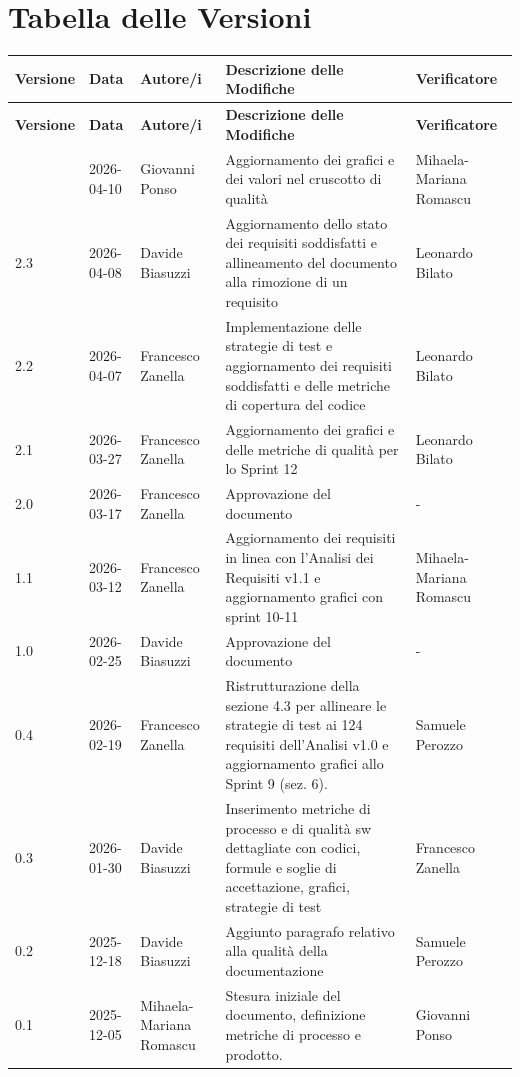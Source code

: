 \documentclass[a4paper,11pt,oneside]{scrartcl}
\begin{document}
\section*{Tabella delle Versioni}
\vspace{0.2cm}
{%
\renewcommand{\arraystretch}{1.2}
\setlength{\LTleft}{-0.4cm}
\setlength{\LTright}{0pt}
\begin{longtable}{@{}llp{}p{}p{}@{}}
    \toprule
    \textbf{Versione} & \textbf{Data} & \textbf{Autore/i} & \textbf{Descrizione delle Modifiche} & \textbf{Verificatore} \\
    \midrule
    \endfirsthead
    \toprule
    \textbf{Versione} & \textbf{Data} & \textbf{Autore/i} & \textbf{Descrizione delle Modifiche} & \textbf{Verificatore} \\
    \midrule
    \endhead
    \bottomrule
    \endfoot
    \bottomrule
    \endlastfoot
2.4 & 2026-04-10 & Giovanni Ponso & Aggiornamento dei grafici e dei valori nel cruscotto di qualità & Mihaela-Mariana Romascu\\
2.3 & 2026-04-08 & Davide Biasuzzi & Aggiornamento dello stato dei requisiti soddisfatti e allineamento del documento alla rimozione di un requisito & Leonardo Bilato\\
2.2 & 2026-04-07 & Francesco Zanella & Implementazione delle strategie di test e aggiornamento dei requisiti soddisfatti e delle metriche di copertura del codice & Leonardo Bilato\\
2.1 & 2026-03-27 & Francesco Zanella & Aggiornamento dei grafici e delle metriche di qualità per lo Sprint 12 & Leonardo Bilato\\
2.0 & 2026-03-17 & Francesco Zanella & Approvazione del documento & -\\
1.1 & 2026-03-12 & Francesco Zanella & Aggiornamento dei requisiti in linea con l'Analisi dei Requisiti v1.1 e aggiornamento grafici con sprint 10-11 & Mihaela-Mariana Romascu\\
1.0 & 2026-02-25 & Davide Biasuzzi & Approvazione del documento & -\\
0.4 & 2026-02-19 & Francesco Zanella & Ristrutturazione della sezione 4.3 per allineare le strategie di test ai 124 requisiti dell'Analisi v1.0 e aggiornamento grafici allo Sprint 9 (sez. 6). & Samuele Perozzo\\
0.3 & 2026-01-30 & Davide Biasuzzi & Inserimento metriche di processo e di qualità sw dettagliate con codici, formule e soglie di accettazione, grafici, strategie di test & Francesco Zanella\\
0.2 & 2025-12-18 & Davide Biasuzzi & Aggiunto paragrafo relativo alla qualità della documentazione & Samuele Perozzo\\
0.1 & 2025-12-05 & Mihaela-Mariana Romascu & Stesura iniziale del documento, definizione metriche di processo e prodotto. & Giovanni Ponso\\
\end{longtable}
}
\end{document}
